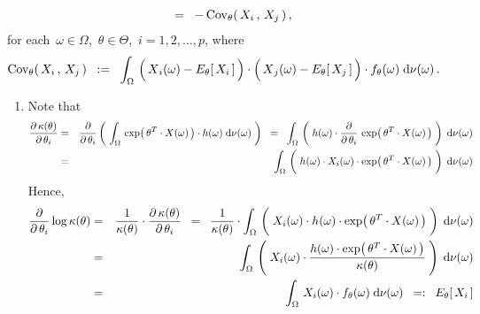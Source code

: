 \begin{theorem}
\begin{enumerate}
\begin{eqnarray*}
	\;\; = \;\;
		-\,\overset{{\color{white}.}}{\Cov}_{\theta}\!\left(\,X_{i}\,,\,X_{j}\,\right),
	\end{eqnarray*}	
	for each \,$\omega\in\Omega$, \,$\theta\in\Theta$, \,$i = 1,2,\ldots,p$, where
	\begin{equation*}
	\overset{{\color{white}.}}{\Cov}_{\theta}\!\left(\,X_{i}\,,\,X_{j}\,\right)
	\;\; := \;\;
		\int_{\Omega}\,
			\left(\,\overset{{\color{white}.}}{X}_{i}(\omega) - E_{\theta}\!\left[\,X_{i}\,\right]\,\right)
			\cdot
			\left(\,\overset{{\color{white}.}}{X}_{j}(\omega) - E_{\theta}\!\left[\,X_{j}\,\right]\,\right)
			\cdot
			f_{\theta}(\omega)
		\;\d\nu(\omega)\,.
	\quad
	\end{equation*}	
\end{enumerate}
\end{theorem}
\proof
\begin{enumerate}
\item
	Note that
	\begin{eqnarray*}
	\dfrac{\partial\,\kappa(\theta)}{\partial\,\theta_{i}}
	& = &
		\dfrac{\partial}{\partial\,\theta_{i}}
		\left(\;
			\int_{\Omega}\,
			\exp\!\left(\,\theta^{T}\cdot X(\omega)\,\right)\cdot h(\omega)
			\;\d\nu(\omega)
		\;\right)
	\;\; = \;\;
		\int_{\Omega}\,
			\left(\;
			h(\omega)
			\cdot
			\dfrac{\partial}{\partial\,\theta_{i}}\,
			\exp\!\left(\,\theta^{T}\cdot X(\omega)\,\right)
			\;\right)
		\;\d\nu(\omega)
	\\
	&=&
		\int_{\Omega}\,
			\left(\;
			\overset{{\color{white}-}}{h}(\omega)
			\cdot
			X_{i}(\omega)
			\cdot
			\exp\!\left(\,\theta^{T}\cdot X(\omega)\,\right)
			\;\right)
		\;\d\nu(\omega)
	\end{eqnarray*}
	Hence,
	\begin{eqnarray*}
	\dfrac{\partial}{\partial\,\theta_{i}} \log \kappa(\theta)
	&=&
		\dfrac{1}{\kappa(\theta)} \cdot \dfrac{\partial\,\kappa(\theta)}{\partial\,\theta_{i}}
	\;\; = \;\;
		\dfrac{1}{\kappa(\theta)}
		\cdot
		\int_{\Omega}\,
			\left(\;
			X_{i}(\omega)
			\cdot
			\overset{{\color{white}-}}{h}(\omega)
			\cdot
			\exp\!\left(\,\theta^{T}\cdot X(\omega)\,\right)
			\;\right)
		\;\d\nu(\omega)
	\\
	& = &
		\int_{\Omega}\,
			\left(\;
			X_{i}(\omega)
			\cdot
			\dfrac{
				h(\omega) \cdot \exp\!\left(\,\theta^{T}\cdot X(\omega)\,\right)
				}{
				\kappa(\theta)
				}
			\;\right)
		\;\d\nu(\omega)
	\\
	& = &
		\int_{\Omega}\,
			X_{i}(\omega) \cdot f_{\theta}(\omega)
		\;\d\nu(\omega)
	\;\; =: \;\;
		E_{\theta}\!\left[\,X_{i}\,\right]

\end{eqnarray*}
\end{enumerate}
